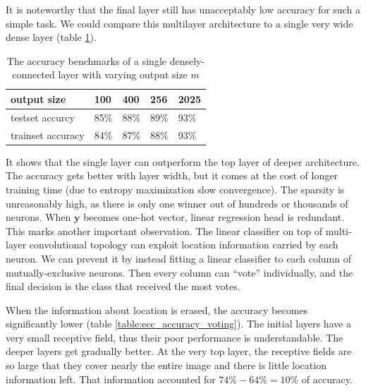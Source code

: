 \documentclass[oneside,english,logo]{amuthesis}
\begin{document}
It is noteworthy that the final layer still has unacceptably low accuracy for such a simple task. We could compare this multilayer architecture to a single very wide dense layer (table \ref{table:ecc_accuracy_wide}).
\begin{table}[]
	\begin{tabular}{|lllll|}
		\hline
		output size      & 100  & 400  & 256  & 2025 \\ \hline
		testset accurcy & 85\% & 88\% & 89\% & 93\% \\ 
		trainset accuracy & 84\% & 87\% & 88\% & 93\% \\
		\hline
	\end{tabular}
	\caption{The accuracy benchmarks of a single densely-connected layer with varying output size $m$}
	\label{table:ecc_accuracy_wide}
\end{table}
It shows that the single layer can outperform the top layer of deeper architecture. The accuracy gets better with layer width, but it comes at the cost of longer training time (due to entropy maximization slow convergence). The sparsity is unreasonably high, as there is only one winner out of hundreds or thousands of neurons. When $\boldsymbol{y}$ becomes one-hot vector, linear regression head is redundant. This marks another important observation. The linear classifier on top of multi-layer convolutional topology can exploit location information carried by each neuron. We can prevent it by instead fitting a linear classifier to each column of mutually-exclusive neurons. Then every column can ``vote'' individually, and the final decision is the class that received the most votes. 
\begin{table}[]
	\caption{The same architecture as in table \ref{table:ecc_accuracy_slow} but the classification head no longer has access to neuron location information}
	\label{table:ecc_accuracy_voting}
\end{table}
When the information about location is erased, the accuracy becomes significantly lower (table \ref{table:ecc_accuracy_voting}). The initial layers have a very small receptive field, thus their poor performance is understandable. The deeper layers get gradually better. At the very top layer, the receptive fields are so large that they cover nearly the entire image and there is little location information left. That information accounted for $74\%-64\%=10\%$ of accuracy. 
\end{document}
